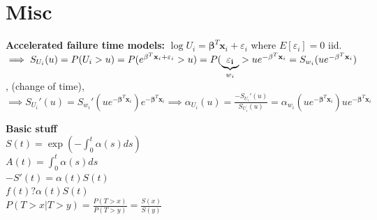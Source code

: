 \documentclass{article}
\begin{document}
\newpage

\section*{Misc}

\textbf{Accelerated failure time models:} $\log U_i = \mathbf{\beta}^T\mathbf{x}_i + \varepsilon_i$ where $E[\varepsilon_i]=0$ iid. $\implies S_{U_i}(u)=P(U_i>u)=P(e^{\mathbf{\beta}^T\mathbf{x}_i + \varepsilon_i}>u) = \\ P(\underbrace{\mathbf{\varepsilon_i}}_{w_i} > ue^{-\mathbf{\beta}^T\mathbf{x}_i} = S_{w_i}(ue^{-\mathbf{\beta}^T\mathbf{x}_i})$, (change of time), $\implies S_{U_i}'(u) = S_{w_i}'(ue^{-\mathbf{\beta}^T\mathbf{x}_i})e^{-\mathbf{\beta}^T\mathbf{x}_i} \implies \alpha_{U_i}(u) = \frac{-S_{U_i}'(u)}{S_{U_i}(u)} = \alpha_{w_i}(ue^{-\mathbf{\beta}^T\mathbf{x}_i})ue^{-\mathbf{\beta}^T\mathbf{x}_i}$


\textbf{Basic stuff} \\
$S(t) = \exp(-\int_0^t \alpha(s)ds)$ \\
$A(t) = \int_0^t \alpha(s)ds$ \\
$-S'(t) = \alpha(t)S(t)$ \\
$f(t)?\alpha(t) S(t)$ \\
$P(T>x | T>y) = \frac{P(T>x)}{P(T>y)} = \frac{S(x)}{S(y)}$ \\
\end{document}
